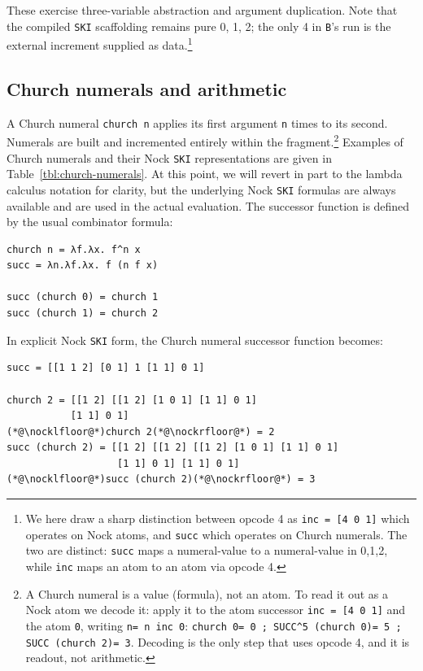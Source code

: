 \documentclass[twoside]{article}
\begin{document}
\noindent
These exercise three-variable abstraction and argument duplication. Note that the compiled \texttt{SKI} scaffolding remains pure {0, 1, 2}; the only 4 in \texttt{B}'s run is the external increment supplied as data.\footnote{We here draw a sharp distinction between opcode 4 as \lstinline[style=inlinecode]{inc = [4 0 1]} which operates on Nock atoms, and \lstinline[style=inlinecode]{succ} which operates on Church numerals.  The two are distinct:  \lstinline[style=inlinecode]{succ} maps a numeral-value to a numeral-value in {0,1,2}, while \lstinline[style=inlinecode]{inc} maps an atom to an atom via opcode 4.}

\subsection{Church numerals and arithmetic}

A Church numeral \lstinline[style=inlinecode]{church n} applies its first argument \lstinline[style=inlinecode]{n} times to its second.  Numerals are built and incremented entirely within the fragment.\footnote{A Church numeral is a value (formula), not an atom.  To read it out as a Nock atom we decode it:  apply it to the atom successor \lstinline[style=inlinecode]{inc = [4 0 1]} and the atom \lstinline[style=inlinecode]{0}, writing \texttt{\nocklfloor n\nockrfloor = n inc 0}:
\texttt{\nocklfloor church 0\nockrfloor = 0 ; \nocklfloor SUCC\^{}5 (church 0)\nockrfloor = 5 ; \nocklfloor SUCC (church 2)\nockrfloor = 3}.  Decoding is the only step that uses opcode 4, and it is readout, not arithmetic.}
Examples of Church numerals and their Nock \texttt{SKI} representations are given in Table~\ref{tbl:church-numerals}.  At this point, we will revert in part to the lambda calculus notation for clarity, but the underlying Nock \texttt{SKI} formulas are always available and are used in the actual evaluation.  The successor function is defined by the usual combinator formula:

\begin{lstlisting}[style=listingblock]
church n = λf.λx. f^n x
succ = λn.λf.λx. f (n f x)

succ (church 0) = church 1
succ (church 1) = church 2
\end{lstlisting}

\noindent
In explicit Nock \texttt{SKI} form, the Church numeral successor function becomes:

\begin{lstlisting}[style=listingblock]
succ = [[1 1 2] [0 1] 1 [1 1] 0 1]

church 2 = [[1 2] [[1 2] [1 0 1] [1 1] 0 1]
           [1 1] 0 1]
(*@\nocklfloor@*)church 2(*@\nockrfloor@*) = 2
succ (church 2) = [[1 2] [[1 2] [[1 2] [1 0 1] [1 1] 0 1]
                   [1 1] 0 1] [1 1] 0 1]
(*@\nocklfloor@*)succ (church 2)(*@\nockrfloor@*) = 3
\end{lstlisting}
\end{document}

